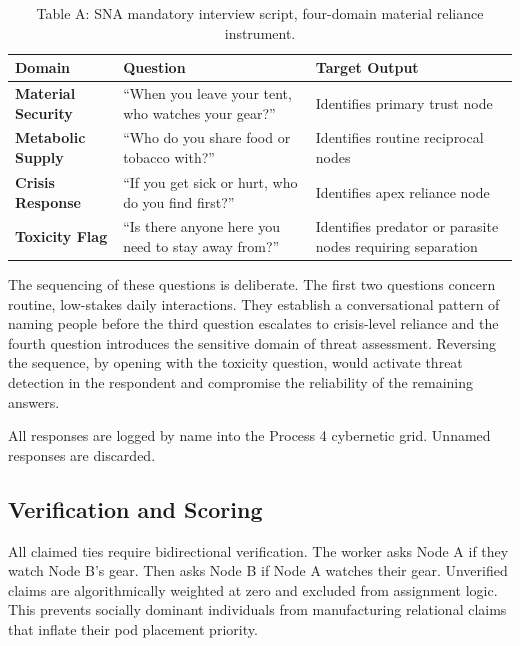 \documentclass[12pt, letterpaper]{article}
\renewcommand{\arraystretch}{1.3}
\begin{document}
\begin{table}[H]
\renewcommand{\arraystretch}{1.2}
\caption*{\textbf{Mandatory Interview Script}}
\begin{tabularx}{\textwidth}{@{} >{\raggedright\arraybackslash}p{3.5cm} >{\raggedright\arraybackslash}X >{\raggedright\arraybackslash}p{5.5cm} @{}}
\toprule
\textbf{Domain} & \textbf{Question} & \textbf{Target Output} \\
\midrule
\textbf{Material Security} & ``When you leave your tent, who watches your gear?'' & Identifies primary trust node \\
\textbf{Metabolic Supply} & ``Who do you share food or tobacco with?'' & Identifies routine reciprocal nodes \\
\textbf{Crisis Response} & ``If you get sick or hurt, who do you find first?'' & Identifies apex reliance node \\
\textbf{Toxicity Flag} & ``Is there anyone here you need to stay away from?'' & Identifies predator or parasite nodes requiring separation \\
\bottomrule
\end{tabularx}
\caption*{Table A: SNA mandatory interview script, four-domain material reliance instrument.}
\end{table}

The sequencing of these questions is deliberate. The first two questions concern routine, low-stakes daily interactions. They establish a conversational pattern of naming people before the third question escalates to crisis-level reliance and the fourth question introduces the sensitive domain of threat assessment. Reversing the sequence, by opening with the toxicity question, would activate threat detection in the respondent and compromise the reliability of the remaining answers.

All responses are logged by name into the Process 4 cybernetic grid. Unnamed responses are discarded.

\subsection{Verification and Scoring}

All claimed ties require bidirectional verification. The worker asks Node A if they watch Node B's gear. Then asks Node B if Node A watches their gear. Unverified claims are algorithmically weighted at zero and excluded from assignment logic. This prevents socially dominant individuals from manufacturing relational claims that inflate their pod placement priority.
\end{document}
